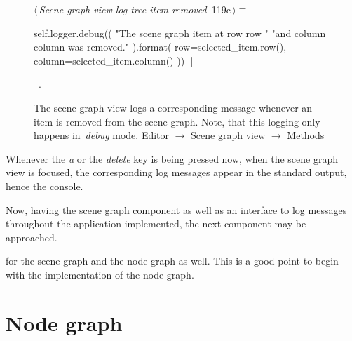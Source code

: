 \documentclass[%
    a4paper,    %
    justified,  %
    nobib,      %
    openany     %
]{tufte-book}
\makeatletter
\renewcommand{\label}[1]{\@tufte@label{##1}}%
\makeatother
\begin{document}
\begin{figure}[!htbp]
\begin{flushleft} \small
\begin{minipage}{\linewidth}\label{scrap60}\raggedright\small
{} $\langle\,${\itshape Scene graph view log tree item removed}\nobreak\ {\footnotesize {119c}}$\,\rangle\equiv$
\vspace{-1ex}
\begin{pythoncode}
self.logger.debug((
    "The scene graph item at row {row} "
    "and column {column} was removed."
).format(
    row=selected_item.row(),
    column=selected_item.column()
))
|\NWsep|
\end{pythoncode}
\vspace{1.5ex}
\footnotesize
\begin{list}{}{\setlength{\itemsep}{-\parsep}\setlength{\itemindent}{-\leftmargin}}
\item \NWtxtMacroRefIn\ .

\item{}
\end{list}
\end{minipage}\vspace{4ex}
\end{flushleft}
\caption{The scene graph view logs a corresponding message whenever an item is
  removed from the scene graph. Note, that this logging only happens
  in~\emph{debug} mode.
  \newline{}\newline{}Editor $\rightarrow$ Scene graph view
  $\rightarrow$ Methods}
\end{figure}

Whenever the \textit{a} or the \textit{delete} key is being pressed now, when
the scene graph view is focused, the corresponding log messages appear in the
standard output, hence the console.

Now, having the scene graph component as well as an interface to log messages
throughout the application implemented, the next component may be approached.

 for the scene graph and the node graph as
well. This is a good point to begin with the implementation of the node graph.


\chapter{Node graph}
\label{appendix:chap:node-graph}
\end{document}
